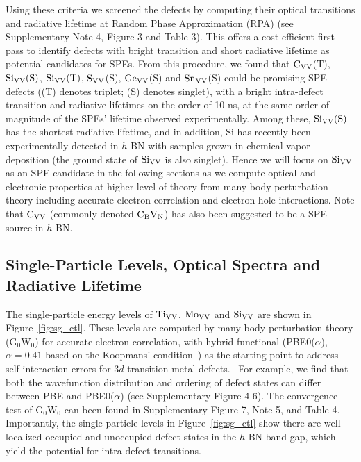Using these criteria we screened the defects by computing their optical transitions and radiative lifetime at Random Phase Approximation (RPA) (see Supplementary Note 4, Figure 3 and Table 3). This offers a cost-efficient first-pass to identify defects with bright transition and short radiative lifetime as potential candidates for SPEs.
From this procedure, we found that $\text{C}_{\text{V}\text{V}}$(T), $\mathrm{Si_{VV}(S)}$, $\mathrm{Si_{VV}(T)}$, $\text{S}_{\text{V}\text{V}}$(S), $\text{Ge}_{\text{V}\text{V}}$(S) and $\text{Sn}_{\text{V}\text{V}}$(S) could be promising SPE defects ((T) denotes triplet; (S) denotes singlet), with a bright intra-defect transition and radiative lifetimes on the order of 10 ns, at the same order of magnitude of the SPEs' lifetime observed experimentally.
\cite{schell2017coupling}
Among these, $\mathrm{Si_{VV}(S)}$ has the shortest radiative lifetime, and in addition, Si has recently been experimentally detected in $h$-BN with samples grown in chemical vapor deposition (the ground state of $\text{Si}_{\text{V}\text{V}}$ is also singlet).\cite{ahmadpour2019substitutional}
Hence we will focus on $\text{Si}_{\text{V}\text{V}}$ as an SPE candidate in the following sections as we compute optical and electronic properties at higher level of theory from many-body perturbation theory including accurate electron correlation and electron-hole interactions.
Note that $\text{C}_{\text{V}\text{V}}$ (commonly denoted $\rm C_BV_N$) has also been suggested to be a SPE source in $h$-BN.~\cite{sajid2020vncb}


\subsection{Single-Particle Levels, Optical Spectra and Radiative Lifetime}

The single-particle energy levels of $\text{Ti}_{\text{V}\text{V}}$, $\text{Mo}_{\text{V}\text{V}}$ and $\text{Si}_{\text{V}\text{V}}$ are shown in Figure~\ref{fig:sg_ctl}.
These levels are computed by many-body perturbation theory ($\mathrm{G_0W_0}$) for accurate electron correlation,
with hybrid functional (PBE0($\alpha$), $\alpha=0.41$ based on the Koopmans' condition~\cite{smart2018fundamental}) as the starting point to address self-interaction errors for $3d$ transition metal defects.~\cite{fuchs2007quasiparticle,bechstedt2016many}
For example, we find that both the wavefunction distribution and ordering of defect states can differ between PBE and PBE0($\alpha$) (see Supplementary Figure 4-6). The convergence test of $\mathrm{G_0W_0}$ can been found in Supplementary Figure 7, Note 5, and Table 4.
Importantly, the single particle levels in Figure~\ref{fig:sg_ctl} show there are well localized occupied and unoccupied defect states in the $h$-BN band gap, which yield the potential for intra-defect transitions.

